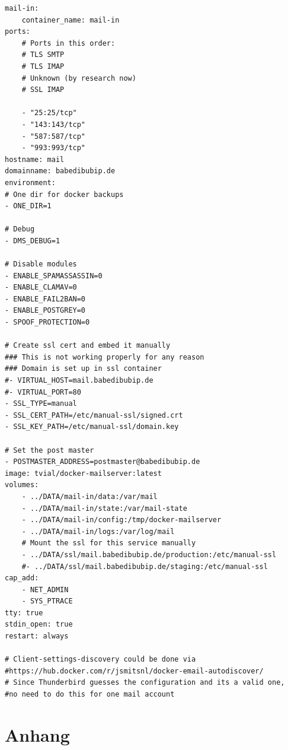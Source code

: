 \documentclass[a4paper,11pt,singlespacing]{article}
\begin{document}
\newpage




\listoffigures
{}

\lstlistoflistings
{}
	\begin{lstlisting}[caption={Mail-in, docker-compose.yml}]
mail-in:
	container_name: mail-in
ports:
	# Ports in this order:
	# TLS SMTP
	# TLS IMAP
	# Unknown (by research now)
	# SSL IMAP
	
	- "25:25/tcp"
	- "143:143/tcp"
	- "587:587/tcp"
	- "993:993/tcp"
hostname: mail
domainname: babedibubip.de
environment:
# One dir for docker backups
- ONE_DIR=1

# Debug
- DMS_DEBUG=1

# Disable modules
- ENABLE_SPAMASSASSIN=0
- ENABLE_CLAMAV=0
- ENABLE_FAIL2BAN=0
- ENABLE_POSTGREY=0
- SPOOF_PROTECTION=0

# Create ssl cert and embed it manually
### This is not working properly for any reason
### Domain is set up in ssl container
#- VIRTUAL_HOST=mail.babedibubip.de
#- VIRTUAL_PORT=80
- SSL_TYPE=manual
- SSL_CERT_PATH=/etc/manual-ssl/signed.crt
- SSL_KEY_PATH=/etc/manual-ssl/domain.key

# Set the post master
- POSTMASTER_ADDRESS=postmaster@babedibubip.de
image: tvial/docker-mailserver:latest
volumes:
	- ../DATA/mail-in/data:/var/mail
	- ../DATA/mail-in/state:/var/mail-state
	- ../DATA/mail-in/config:/tmp/docker-mailserver
	- ../DATA/mail-in/logs:/var/log/mail
	# Mount the ssl for this service manually
	- ../DATA/ssl/mail.babedibubip.de/production:/etc/manual-ssl
	#- ../DATA/ssl/mail.babedibubip.de/staging:/etc/manual-ssl
cap_add:
	- NET_ADMIN
	- SYS_PTRACE
tty: true
stdin_open: true
restart: always

# Client-settings-discovery could be done via 
#https://hub.docker.com/r/jsmitsnl/docker-email-autodiscover/
# Since Thunderbird guesses the configuration and its a valid one,
#no need to do this for one mail account
	\end{lstlisting}
\newpage
%
\section*{Anhang}\label{Anhang}
%
\end{document}
